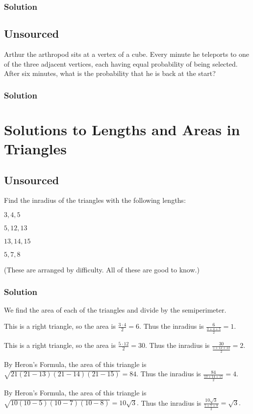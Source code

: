 \documentclass[blue,onecol]{shooting}
\begin{document}
\subsection{Solution}




\section{Unsourced}{Arthur the arthropod sits at a vertex of a cube.  Every minute he teleports to one of the three adjacent vertices, each having equal probability of being selected.  After six minutes, what is the probability that he is back at the start?}
\subsection{Solution}





\chapter{Solutions to Lengths and Areas in Triangles}












\section{Unsourced}
Find the inradius of the triangles with the following lengths:
    
    \begin{itemize}
        \Item $3,4,5$
        
        \Item $5,12,13$
        
        \Item $13,14,15$
        
        \Item $5,7,8$
    \end{itemize}

    (These are arranged by difficulty. All of these are good to know.)
    
\subsection{Solution}
We find the area of each of the triangles and divide by the semiperimeter.
\begin{itemize}
\Item This is a right triangle, so the area is $\frac{3\cdot 4}{2}=6.$ Thus the inradius is $\frac{6}{\frac{3+4+5}{2}}=1.$

\Item This is a right triangle, so the area is $\frac{5\cdot 12}{2}=30.$ Thus the inradius is $\frac{30}{\frac{5+12+13}{2}}=2.$

\Item By Heron's Formula, the area of this triangle is $\sqrt{21(21-13)(21-14)(21-15)}=84.$ Thus the inradius is $\frac{84}{\frac{13+14+15}{2}}=4.$

\Item By Heron's Formula, the area of this triangle is $\sqrt{10(10-5)(10-7)(10-8)}=10\sqrt{3}.$ Thus the inradius is $\frac{10\sqrt{3}}{\frac{5+7+8}{2}}=\sqrt{3}.$
\end{itemize}
\end{document}
